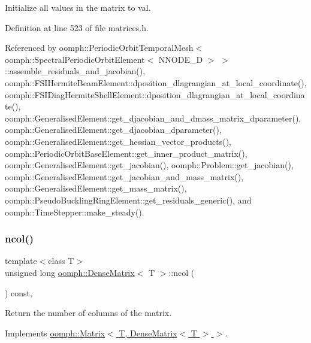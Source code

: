 Initialize all values in the matrix to val. 



Definition at line 523 of file matrices.\+h.



Referenced by oomph\+::\+Periodic\+Orbit\+Temporal\+Mesh$<$ oomph\+::\+Spectral\+Periodic\+Orbit\+Element$<$ N\+N\+O\+D\+E\+\_\+D $>$ $>$\+::assemble\+\_\+residuals\+\_\+and\+\_\+jacobian(), oomph\+::\+F\+S\+I\+Hermite\+Beam\+Element\+::dposition\+\_\+dlagrangian\+\_\+at\+\_\+local\+\_\+coordinate(), oomph\+::\+F\+S\+I\+Diag\+Hermite\+Shell\+Element\+::dposition\+\_\+dlagrangian\+\_\+at\+\_\+local\+\_\+coordinate(), oomph\+::\+Generalised\+Element\+::get\+\_\+djacobian\+\_\+and\+\_\+dmass\+\_\+matrix\+\_\+dparameter(), oomph\+::\+Generalised\+Element\+::get\+\_\+djacobian\+\_\+dparameter(), oomph\+::\+Generalised\+Element\+::get\+\_\+hessian\+\_\+vector\+\_\+products(), oomph\+::\+Periodic\+Orbit\+Base\+Element\+::get\+\_\+inner\+\_\+product\+\_\+matrix(), oomph\+::\+Generalised\+Element\+::get\+\_\+jacobian(), oomph\+::\+Problem\+::get\+\_\+jacobian(), oomph\+::\+Generalised\+Element\+::get\+\_\+jacobian\+\_\+and\+\_\+mass\+\_\+matrix(), oomph\+::\+Generalised\+Element\+::get\+\_\+mass\+\_\+matrix(), oomph\+::\+Pseudo\+Buckling\+Ring\+Element\+::get\+\_\+residuals\+\_\+generic(), and oomph\+::\+Time\+Stepper\+::make\+\_\+steady().

\mbox{\label{classoomph_1_1DenseMatrix_a9937181f1cb4cfaed7aaf3b483c42456}} 
\subsubsection{\texorpdfstring{ncol()}{ncol()}}
{\footnotesize\ttfamily template$<$class T$>$ \\
unsigned long \hyperlink{classoomph_1_1DenseMatrix}{oomph\+::\+Dense\+Matrix}$<$ T $>$\+::ncol (\begin{DoxyParamCaption}{ }\end{DoxyParamCaption}) const\hspace{0.3cm}{\ttfamily [inline]}, {\ttfamily [virtual]}}



Return the number of columns of the matrix. 



Implements \hyperlink{classoomph_1_1Matrix_ad1af46b34096c348272b0dfacb5ce6a9}{oomph\+::\+Matrix$<$ T, Dense\+Matrix$<$ T $>$ $>$}.



